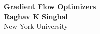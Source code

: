 \documentclass[a0,portrait]{a0poster}
\begin{document}


\begin{minipage}[b]{0.75\linewidth}
\VeryHuge \color{NavyBlue} \textbf{Gradient Flow Optimizers} \color{Black}\\ %
\huge \textbf{Raghav K Singhal}\\[0.5cm] %
\huge New York University\\[0.4cm] %
\end{minipage}
\end{document}
